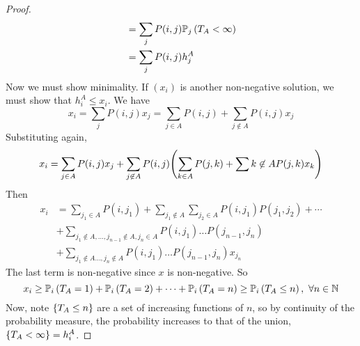 \begin{proof}
\begin{align*}
		 & = \sum_j P(i,j) \mathbb{P}_{j}\left({T_A < \infty}\right)                                                                                                                                     \\
		 & = \sum_j P(i,j) h_j^A
	\end{align*}
	Now we must show minimality.
	If \( (x_i) \) is another non-negative solution, we must show that \( h_i^A \leq x_i \).
	We have
	\[
		x_i = \sum_j P(i,j) x_j = \sum_{j \in A} P(i,j) + \sum_{j \not\in A} P(i,j) x_j
	\]
	Substituting again,
	\[
		x_i = \sum_{j \in A} P(i,j) x_j + \sum_{j \not\in A} P(i,j) \qty( \sum_{k \in A} P(j,k) + \sum{k \not\in A} P(j,k) x_k )
	\]
	Then
	\begin{align*}
		x_i &= \sum_{j_1 \in A} P(i,j_1) + \sum_{j_1 \not\in A} \sum_{j_2 \in A} P(i,j_1)P(j_1,j_2) + \cdots \\
		&+ \sum_{j_1 \not\in A, \dots, j_{n-1} \not\in A, j_n \in A} P(i,j_1)\dots P(j_{n-1},j_n) \\
		&+ \sum_{j_1 \not\in A \dots, j_n \not\in A} P(i,j_1)\dots P(j_{n-1},j_n) x_{j_n}
	\end{align*}
	The last term is non-negative since \( x \) is non-negative.
	So
	\[
		x_i \geq \mathbb{P}_{i}\left({T_A = 1}\right) + \mathbb{P}_{i}\left({T_A = 2}\right) + \dots + \mathbb{P}_{i}\left({T_A = n}\right) \geq \mathbb{P}_{i}\left({T_A \leq n}\right),\ \forall n \in \mathbb N
	\]
	Now, note \( \qty{T_A \leq n} \) are a set of increasing functions of \( n \), so by continuity of the probability measure, the probability increases to that of the union, \( \qty{T_A < \infty} = h_i^A \).
\end{proof}
